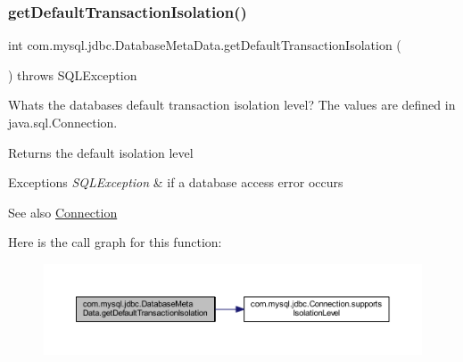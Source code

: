 \subsubsection{\texorpdfstring{get\+Default\+Transaction\+Isolation()}{getDefaultTransactionIsolation()}}
{\footnotesize\ttfamily int com.\+mysql.\+jdbc.\+Database\+Meta\+Data.\+get\+Default\+Transaction\+Isolation (\begin{DoxyParamCaption}{ }\end{DoxyParamCaption}) throws S\+Q\+L\+Exception}

What\textquotesingle{}s the database\textquotesingle{}s default transaction isolation level? The values are defined in java.\+sql.\+Connection.

\begin{DoxyReturn}{Returns}
the default isolation level 
\end{DoxyReturn}

\begin{DoxyExceptions}{Exceptions}
{\em S\+Q\+L\+Exception} & if a database access error occurs \\
\hline
\end{DoxyExceptions}
\begin{DoxySeeAlso}{See also}
\mbox{\hyperlink{interfacecom_1_1mysql_1_1jdbc_1_1_connection}{Connection}} 
\end{DoxySeeAlso}
Here is the call graph for this function\+:\nopagebreak
\begin{figure}[H]
\begin{center}
\leavevmode
\includegraphics[width=350pt]{classcom_1_1mysql_1_1jdbc_1_1_database_meta_data_ac945602242f39a14278fa4951d98eb64_cgraph}
\end{center}
\end{figure}
\mbox{\label{classcom_1_1mysql_1_1jdbc_1_1_database_meta_data_a4acfb73ff8817fb89934e9a30795e5cc}} 
